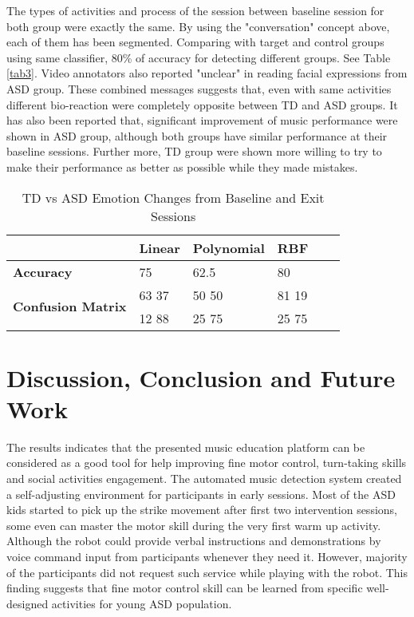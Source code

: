 \documentclass[conference]{IEEEtran}
\begin{document}
The types of activities and process of the session between baseline session for both group were 
exactly the same. By using the "conversation" concept above, each of them has been segmented.
Comparing with target and control groups using same classifier, 80\% of accuracy for detecting
different groups. See Table \ref{tab3}. Video annotators also reported "unclear" in reading 
facial expressions from ASD group. These combined messages suggests that, even with same activities
different bio-reaction were completely opposite between TD and ASD groups. It has 
also been reported that, significant improvement of music performance were shown in ASD group, 
although both groups have similar performance at their baseline sessions. Further more, TD group 
were shown more willing to try to make their performance as better as possible while they made
mistakes.\\

\begin{table*}[tbp]
	\caption{TD vs ASD Emotion Changes from Baseline and Exit Sessions}
	\begin{center}
	\begin{tabular}{llllll}
	                                           & \textbf{Linear} & \textbf{Polynomial} & \textbf{RBF} \\
	\hline

	\textbf{Accuracy}                          & 75              & 62.5                & 80           \\
	\hline
	\multirow{2}{*}{\textbf{Confusion Matrix}} & 63  37          & 50  50              & 81  19       \\
											   & 12  88          & 25  75              & 25  75       \\
	\hline
	\end{tabular}
	\label{tab4}
\end{center}
\end{table*}


\section{Discussion, Conclusion and Future Work}
The results indicates that the presented music education platform can be considered as a good tool for help 
improving fine motor control, turn-taking skills and social activities engagement. The automated music 
detection system created a self-adjusting environment for participants in early sessions. Most
of the ASD kids started to pick up the strike movement after first two intervention sessions, some 
even can master the motor skill during the very first warm up activity. Although the robot could
provide verbal instructions and demonstrations by voice command input from participants whenever they need it. However, 
majority of the participants did not request such service while playing with the robot. This finding
suggests that fine motor control skill can be learned from specific well-designed activities for
young ASD population. 
\end{document}
